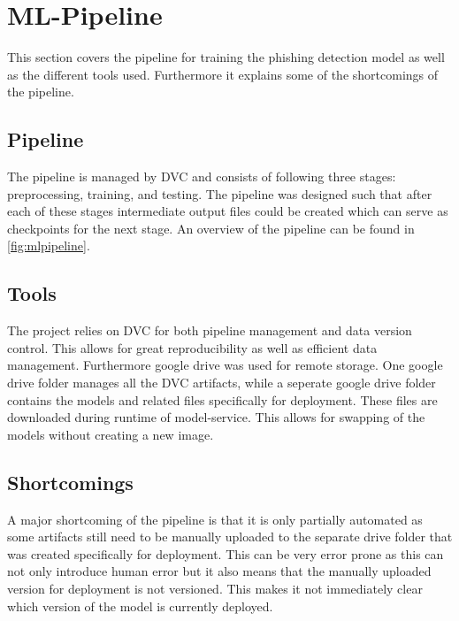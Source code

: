 
\usetikzlibrary{positioning, arrows.meta}
\section{ML-Pipeline}
This section covers the pipeline for training the phishing detection model as well as the different tools used. Furthermore it explains some of the shortcomings of the pipeline.

\subsection{Pipeline}
The pipeline is managed by DVC and consists of following three stages: preprocessing, training, and testing. The pipeline was designed such that after each of these stages intermediate output files could be created which can serve as checkpoints for the next stage. An overview of the pipeline can be found in \autoref{fig:mlpipeline}.


\subsection{Tools}
The project relies on DVC for both pipeline management and data version control. This allows for great reproducibility as well as efficient data management. Furthermore google drive was used for remote storage. One google drive folder manages all the DVC artifacts, while a seperate google drive folder contains the models and related files specifically for deployment. These files are downloaded during runtime of model-service. This allows for swapping of the models without creating a new image.

\subsection{Shortcomings}
A major shortcoming of the pipeline is that it is only partially automated as some artifacts still need to be manually uploaded to the separate drive folder that was created specifically for deployment. This can be very error prone as this can not only introduce human error but it also means that the manually uploaded version for deployment is not versioned. This makes it not immediately clear which version of the model is currently deployed.



